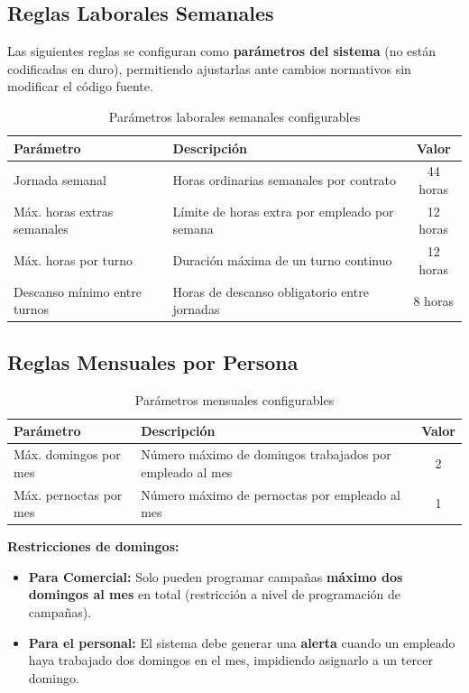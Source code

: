 \documentclass[10pt,a4paper]{article}
\begin{document}
\subsection{Reglas Laborales Semanales}

Las siguientes reglas se configuran como \textbf{par\'{a}metros del sistema} (no est\'{a}n codificadas en duro), permitiendo ajustarlas ante cambios normativos sin modificar el c\'{o}digo fuente.

\begin{table}[h!]
\centering
\begin{tabularx}{\textwidth}{|l|X|c|}
\hline
\textbf{Par\'{a}metro} & \textbf{Descripci\'{o}n} & \textbf{Valor} \\
\hline
Jornada semanal & Horas ordinarias semanales por contrato & 44 horas \\
\hline
M\'{a}x. horas extras semanales & L\'{i}mite de horas extra por empleado por semana & 12 horas \\
\hline
M\'{a}x. horas por turno & Duraci\'{o}n m\'{a}xima de un turno continuo & 12 horas \\
\hline
Descanso m\'{i}nimo entre turnos & Horas de descanso obligatorio entre jornadas & 8 horas \\
\hline
\end{tabularx}
\caption{Par\'{a}metros laborales semanales configurables}
\end{table}

\subsection{Reglas Mensuales por Persona}

\begin{table}[h!]
\centering
\begin{tabularx}{\textwidth}{|l|X|c|}
\hline
\textbf{Par\'{a}metro} & \textbf{Descripci\'{o}n} & \textbf{Valor} \\
\hline
M\'{a}x. domingos por mes & N\'{u}mero m\'{a}ximo de domingos trabajados por empleado al mes & 2 \\
\hline
M\'{a}x. pernoctas por mes & N\'{u}mero m\'{a}ximo de pernoctas por empleado al mes & 1 \\
\hline
\end{tabularx}
\caption{Par\'{a}metros mensuales configurables}
\end{table}

\textbf{Restricciones de domingos:}
\begin{itemize}[leftmargin=2em]
    \item \textbf{Para Comercial:} Solo pueden programar campañas \textbf{m\'{a}ximo dos domingos al mes} en total (restricci\'{o}n a nivel de programaci\'{o}n de campañas).
    \item \textbf{Para el personal:} El sistema debe generar una \textbf{alerta} cuando un empleado haya trabajado dos domingos en el mes, impidiendo asignarlo a un tercer domingo.
\end{itemize}
\end{document}
